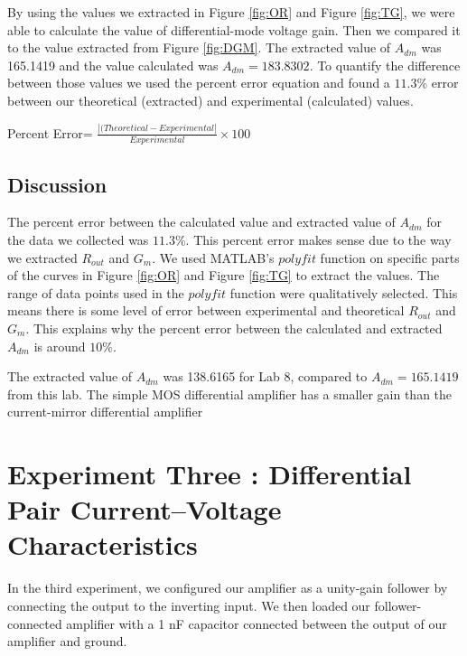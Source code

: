\documentclass{article}
\begin{document}
 By using the values we extracted in Figure \ref{fig:OR} and Figure \ref{fig:TG}, we were able to calculate the value of differential-mode voltage gain.  Then we compared it to the value extracted from Figure \ref{fig:DGM}.  The extracted value of $A_{dm}$ was 165.1419 and the value calculated was $A_{dm} = 183.8302$.  To quantify the difference between those values we used the percent error equation and found a $11.3 \%$ error between our theoretical (extracted) and experimental (calculated) values. 
 \begin{center}
Percent Error= $\frac{|(Theoretical-Experimental|}{Experimental}\times 100$ 
 \end{center}
\subsection{Discussion}

The percent error between the calculated value and extracted value of $A_{dm}$ for the data we collected was $11.3 \%$.  This percent error makes sense due to the way we extracted $R_{out}$ and $G_{m}$.  We used MATLAB's $polyfit$ function on specific parts of the curves in Figure \ref{fig:OR} and Figure \ref{fig:TG} to extract the values.  The range of data points used in the $polyfit$ function were qualitatively selected.   This means there is some level of error between experimental and theoretical $R_{out}$ and $G_{m}$.  This explains why the percent error between the calculated and extracted $A_{dm}$ is around $ 10 \%$.

The extracted value of $A_{dm}$ was 138.6165 for Lab 8, compared to ${A_{dm} = 165.1419}$ from this lab.  The simple MOS differential amplifier has a smaller gain than the current-mirror differential amplifier 
\section{Experiment Three : Differential Pair Current–Voltage Characteristics}
In the third experiment, we configured our amplifier as a unity-gain follower by connecting the output to the inverting input. We then loaded our follower-connected amplifier with a 1 nF capacitor connected between the output of our amplifier and ground.
\end{document}
